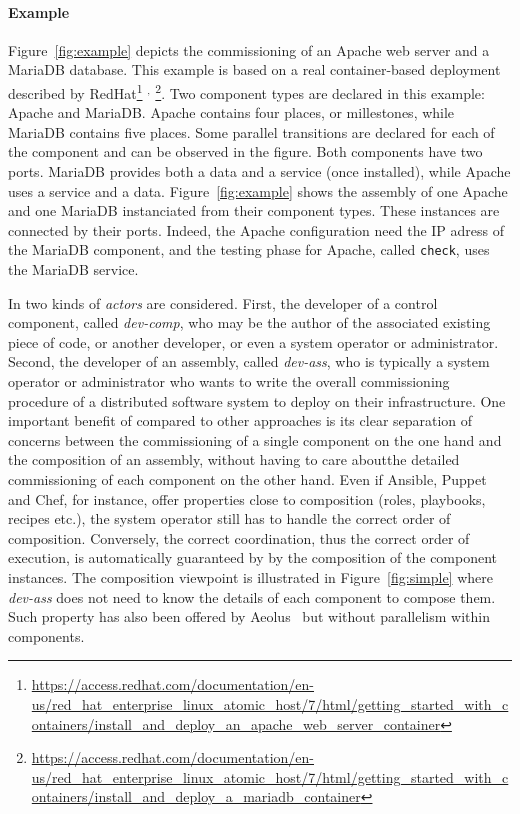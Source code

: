 \paragraph{Example}{ Figure~\ref{fig:example} depicts the \mad
  commissioning of an Apache web server and a MariaDB database. This
  example is based on a real container-based deployment described by
  RedHat\footnote{\url{https://access.redhat.com/documentation/en-us/red_hat_enterprise_linux_atomic_host/7/html/getting_started_with_containers/install_and_deploy_an_apache_web_server_container}}%
  $^,$%
  \footnote{\url{https://access.redhat.com/documentation/en-us/red_hat_enterprise_linux_atomic_host/7/html/getting_started_with_containers/install_and_deploy_a_mariadb_container}}. Two
  \mad component types are declared in this example: Apache
  and MariaDB. Apache contains four places, or millestones, while
  MariaDB contains five places. Some parallel transitions are declared
  for each of the component and can be observed in the figure. Both
  components have two ports. MariaDB provides both a data and a
  service (once installed), while Apache uses a service and a
  data. Figure~\ref{fig:example} shows the assembly of one Apache and
  one MariaDB instanciated from their component types. These instances
  are connected by their ports. Indeed, the Apache configuration need
  the IP adress of the MariaDB component, and the testing phase for
  Apache, called \texttt{check}, uses the MariaDB service.}

In \mad two kinds of \emph{actors} are considered. First, the
developer of a control component, called \emph{dev-comp}, who may be
the author of the associated existing piece of code, or
another developer, or even a system operator or administrator. Second,
the developer of an assembly, called \emph{dev-ass}, who is typically
 a system operator or administrator
who wants to write the overall commissioning procedure of a
distributed software system to deploy on their infrastructure. One
important benefit of \mad compared to other approaches is its clear
separation of concerns between the commissioning of a single component
on the one hand and the composition of an assembly, without having to
care aboutthe detailed commissioning of each component on the other hand.
Even if Ansible, Puppet and
Chef, for instance, offer properties close to composition (\eg roles,
playbooks, recipes etc.), the system operator still has to handle the
correct order of composition. Conversely, the correct coordination,
thus the correct order of execution, is automatically guaranteed by
\mad by the composition of the component instances. The composition
viewpoint is illustrated in Figure~\ref{fig:simple} where
\emph{dev-ass} does not need to know the details of each component to
compose them. Such property has also been offered by Aeolus~\cite{}
but without parallelism within components.

